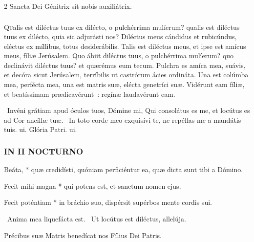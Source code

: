 \documentclass[9pt,twoside]{extarticle}
\begin{document}
\begin{multicols}{2}
\smallskip
{\small {} Sancta Dei Génitrix sit nobis auxiliátrix.}

\subsubsection*{\center \normalfont {}}
\lettrine{Q}{u}alis est diléctus tuus ex dilécto, o pulchérrima mulíerum? qualis est diléctus tuus ex dilécto, quia sic adjurásti nos?
Diléctus meus cándidus et rubicúndus, eléctus ex míllibus, totus desiderábilis. Talis est diléctus meus, et ipse est amícus meus, fíliæ Jerúsalem.
Quo ábiit diléctus tuus, o pulchérrima mulíerum? quo declinávit diléctus tuus? et quærémus eum tecum.
Pulchra es amíca mea, suávis, et decóra sicut Jerúsalem, terríbilis ut castrórum ácies ordináta.
Una est colúmba mea, perfécta mea, una est matris suæ, elécta genetríci suæ. Vidérunt eam fíliæ, et beatíssimam prædicavérunt~: regínæ laudavérunt eam.

~Invéni grátiam apud óculos tuos, Dómine mi, \textred{*} Qui consolátus es me, et locútus es ad Cor ancíllæ tuæ. ~In toto corde meo exquisívi te, ne repéllas me a mandátis tuis. ui. Glória Patri. ui.

\subsubsection*{\center \normalfont \small \textsc{IN II NOCTURNO}}

\smallskip
{} Beáta, * quæ credidísti, quóniam perficiéntur ea, quæ dicta sunt tibi a Dómino.

 Fecit mihi magna * qui potens est, et sanctum nomen ejus.

 Fecit poténtiam * in bráchio suo, dispérsit supérbos mente cordis sui.

\smallskip
{}~Anima mea liquefácta est. ~Ut locútus est diléctus, allelúja.

\smallskip
{\small {} Précibus suæ Matris benedícat nos Fílius Dei Patris.}


\end{multicols}
\end{document}
